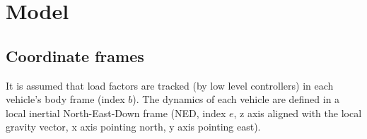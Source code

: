 \documentclass{ifacconf}
\begin{document}
\section{Model}
\label{sec:model}
\subsection{Coordinate frames}
It is assumed that load factors are tracked (by low level controllers) in each vehicle's body frame (index $b$). 
The dynamics of each vehicle are defined in a local inertial North-East-Down frame (NED, index $e$, z axis aligned with the local gravity vector, x axis pointing north, y axis pointing east). 

\end{document}

